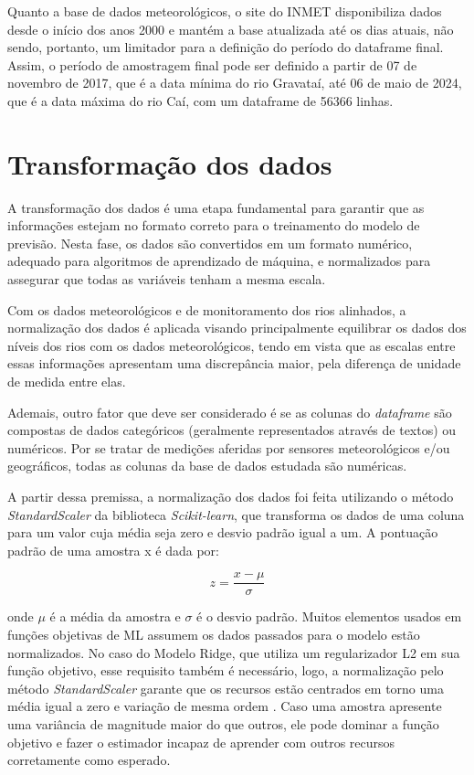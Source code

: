 Quanto a base de dados meteorológicos, o site do INMET disponibiliza dados desde o início dos anos 2000 e mantém a base atualizada até os dias atuais, não sendo, portanto, um limitador para a definição do período do dataframe final. Assim, o período de amostragem final pode ser definido a partir de 07 de novembro de 2017, que é a data mínima do rio Gravataí, até 06 de maio de 2024, que é a data máxima do rio Caí, com um dataframe de 56366 linhas.

\section{Transformação dos dados}

A transformação dos dados é uma etapa fundamental para garantir que as informações estejam no formato correto para o treinamento do modelo de previsão. Nesta fase, os dados são convertidos em um formato numérico, adequado para algoritmos de aprendizado de máquina, e normalizados para assegurar que todas as variáveis tenham a mesma escala.

Com os dados meteorológicos e de monitoramento dos rios alinhados, a normalização dos dados é aplicada visando principalmente equilibrar os dados dos níveis dos rios com os dados meteorológicos, tendo em vista que as escalas entre essas informações apresentam uma discrepância maior, pela diferença de unidade de medida entre elas.

Ademais, outro fator que deve ser considerado é se as colunas do \textit{dataframe} são compostas de dados categóricos (geralmente representados através de textos) ou numéricos. Por se tratar de medições aferidas por sensores meteorológicos e/ou geográficos, todas as colunas da base de dados estudada são numéricas.

A partir dessa premissa, a normalização dos dados foi feita utilizando o método \textit{StandardScaler} da biblioteca \textit{Scikit-learn}, que transforma os dados de uma coluna para um valor cuja média seja zero e desvio padrão igual a um. A pontuação padrão de uma amostra x é dada por:

\begin{equation}
z = \frac{x - \mu}{\sigma}
\end{equation}

\noindent onde \( \mu \) é a média da amostra e \( \sigma \) é o desvio padrão. Muitos elementos usados em funções objetivas de \gls{ML} assumem os dados passados para o modelo estão normalizados. No caso do Modelo Ridge, que utiliza um regularizador L2 em sua função objetivo, esse requisito também é necessário, logo, a normalização pelo método \textit{StandardScaler} garante que os recursos estão centrados em torno uma média igual a zero e variação de mesma ordem \cite{scikit_learn_standardscaler}. Caso uma amostra apresente uma variância de magnitude maior do que outros, ele pode dominar a função objetivo e fazer o estimador incapaz de aprender com outros recursos corretamente como esperado.

